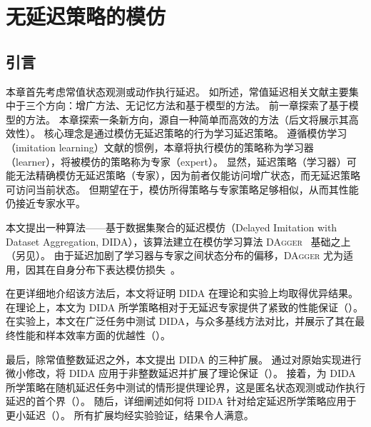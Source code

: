 \chapter{无延迟策略的模仿}
\label{chap:imitation_undelayed}

\section{引言}
本章首先考虑常值状态观测或动作执行延迟。
如所述，常值延迟相关文献主要集中于三个方向：增广方法、无记忆方法和基于模型的方法。
前一章探索了基于模型的方法。
本章探索一条新方向，源自一种简单而高效的方法（后文将展示其高效性）。
核心理念是通过模仿无延迟策略的行为学习延迟策略。
遵循模仿学习（imitation learning）文献的惯例，本章将执行模仿的策略称为学习器（learner），将被模仿的策略称为专家（expert）。
显然，延迟策略（学习器）可能无法精确模仿无延迟策略（专家），因为前者仅能访问增广状态，而无延迟策略可访问当前状态。
但期望在于，模仿所得策略与专家策略足够相似，从而其性能仍接近专家水平。

本文提出一种算法——基于数据集聚合的延迟模仿（Delayed Imitation with Dataset Aggregation, DIDA），该算法建立在模仿学习算法 \textsc{DAgger}~\cite{ross2011reduction} 基础之上（另见）。
由于延迟加剧了学习器与专家之间状态分布的偏移，\textsc{DAgger} 尤为适用，因其在自身分布下表达模仿损失~\cite{osa2018algorithmic}。

在更详细地介绍该方法后，本文将证明 DIDA 在理论和实验上均取得优异结果。
在理论上，本文为 DIDA 所学策略相对于无延迟专家提供了紧致的性能保证（）。
在实验上，本文在广泛任务中测试 DIDA，与众多基线方法对比，并展示了其在最终性能和样本效率方面的优越性（）。

最后，除常值整数延迟之外，本文提出 DIDA 的三种扩展。
通过对原始实现进行微小修改，将 DIDA 应用于非整数延迟并扩展了理论保证（）。
接着，为 DIDA 所学策略在随机延迟任务中测试的情形提供理论界，这是匿名状态观测或动作执行延迟的首个界（）。
随后，详细阐述如何将 DIDA 针对给定延迟所学策略应用于更小延迟（）。
所有扩展均经实验验证，结果令人满意。





